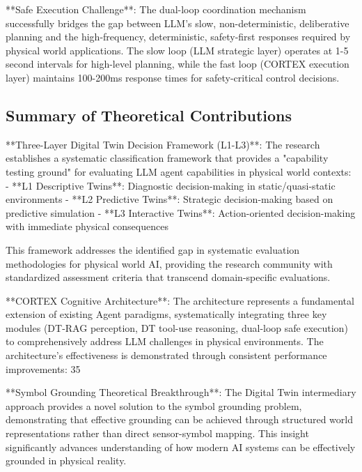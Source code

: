 **Safe Execution Challenge**: The dual-loop coordination mechanism successfully bridges the gap between LLM's slow, non-deterministic, deliberative planning and the high-frequency, deterministic, safety-first responses required by physical world applications. The slow loop (LLM strategic layer) operates at 1-5 second intervals for high-level planning, while the fast loop (CORTEX execution layer) maintains 100-200ms response times for safety-critical control decisions.

\subsection{Summary of Theoretical Contributions}

**Three-Layer Digital Twin Decision Framework (L1-L3)**: The research establishes a systematic classification framework that provides a "capability testing ground" for evaluating LLM agent capabilities in physical world contexts:
- **L1 Descriptive Twins**: Diagnostic decision-making in static/quasi-static environments
- **L2 Predictive Twins**: Strategic decision-making based on predictive simulation
- **L3 Interactive Twins**: Action-oriented decision-making with immediate physical consequences

This framework addresses the identified gap in systematic evaluation methodologies for physical world AI, providing the research community with standardized assessment criteria that transcend domain-specific evaluations.

**CORTEX Cognitive Architecture**: The architecture represents a fundamental extension of existing Agent paradigms, systematically integrating three key modules (DT-RAG perception, DT tool-use reasoning, dual-loop safe execution) to comprehensively address LLM challenges in physical environments. The architecture's effectiveness is demonstrated through consistent performance improvements: 35%

**Symbol Grounding Theoretical Breakthrough**: The Digital Twin intermediary approach provides a novel solution to the symbol grounding problem, demonstrating that effective grounding can be achieved through structured world representations rather than direct sensor-symbol mapping. This insight significantly advances understanding of how modern AI systems can be effectively grounded in physical reality.


